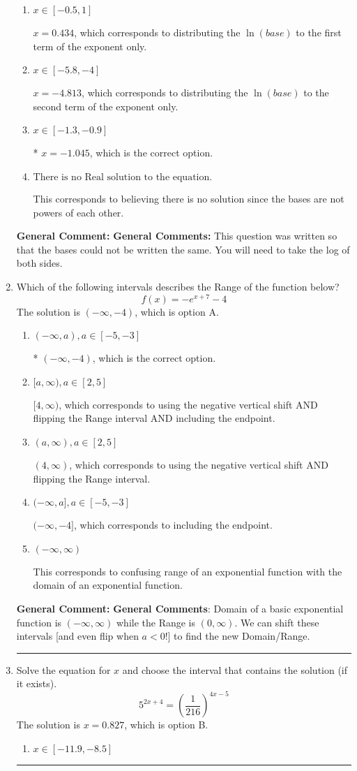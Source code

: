 \documentclass{extbook}[14pt]
\newcommand{\litem}[1]{\item #1

\rule{\textwidth}{0.4pt}}
\begin{document}
\begin{enumerate}
{\begin{enumerate}[label=\Alph*.]
$x = 2.000$, which corresponds to solving the numerators as equal while ignoring the bases are different.
\item \( x \in [-0.5, 1] \)

$x = 0.434$, which corresponds to distributing the $\ln(base)$ to the first term of the exponent only.
\item \( x \in [-5.8, -4] \)

$x = -4.813$, which corresponds to distributing the $\ln(base)$ to the second term of the exponent only.
\item \( x \in [-1.3, -0.9] \)

* $x = -1.045$, which is the correct option.
\item \( \text{There is no Real solution to the equation.} \)

This corresponds to believing there is no solution since the bases are not powers of each other.
\end{enumerate}

\textbf{General Comment:} \textbf{General Comments:} This question was written so that the bases could not be written the same. You will need to take the log of both sides.
}
\litem{
Which of the following intervals describes the Range of the function below?
\[ f(x) = -e^{x+7}-4 \]The solution is \( (-\infty, -4) \), which is option A.\begin{enumerate}[label=\Alph*.]
\item \( (-\infty, a), a \in [-5, -3] \)

* $(-\infty, -4)$, which is the correct option.
\item \( [a, \infty), a \in [2, 5] \)

$[4, \infty)$, which corresponds to using the negative vertical shift AND flipping the Range interval AND including the endpoint.
\item \( (a, \infty), a \in [2, 5] \)

$(4, \infty)$, which corresponds to using the negative vertical shift AND flipping the Range interval.
\item \( (-\infty, a], a \in [-5, -3] \)

$(-\infty, -4]$, which corresponds to including the endpoint.
\item \( (-\infty, \infty) \)

This corresponds to confusing range of an exponential function with the domain of an exponential function.
\end{enumerate}

\textbf{General Comment:} \textbf{General Comments}: Domain of a basic exponential function is $(-\infty, \infty)$ while the Range is $(0, \infty)$. We can shift these intervals [and even flip when $a<0$!] to find the new Domain/Range.
}
\litem{
Solve the equation for $x$ and choose the interval that contains the solution (if it exists).
\[ 5^{2x+4} = \left(\frac{1}{216}\right)^{4x-5} \]The solution is \( x = 0.827 \), which is option B.\begin{enumerate}[label=\Alph*.]
\item \( x \in [-11.9, -8.5] \)


\end{enumerate}}
\end{enumerate}
\end{document}
